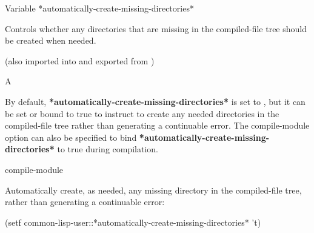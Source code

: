 \documentclass[10pt,twoside,english,pdftex]{article}
\begin{document}
\begin{functiondoc}{Variable}%
  {*automatically-create-missing-directories*}{}%

\fnsyntax

\fnpurpose Controls whether any directories that are missing
in the compiled-file tree should be created when needed.

\fnpackage {} 
(also imported into and exported from )

\fnmodule {}

\fnvaluetype A 

\fninitialvalue {}

\fndescription By default, \textbf{*automatically-create-missing-directories*}
is set to , but it can be set or bound to true to instruct
\textbf{} to create any needed directories in the
compiled-file tree rather than generating a continuable error. The
compile-module option  can also be specified to bind
\textbf{*automatically-create-missing-directories*} to true during
 compilation.

\begin{alsos}{compile-module}
\end{alsos}

\fnexample 
Automatically create, as needed, any missing directory in the compiled-file
tree, rather than generating a continuable error:
%
\W\supp
\begin{example}
  (setf common-lisp-user::*automatically-create-missing-directories* 't)
\end{example}

\end{functiondoc}

\end{document}
